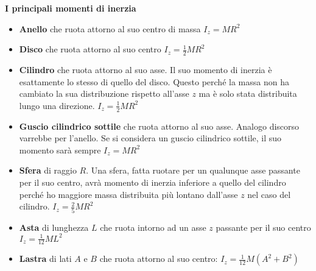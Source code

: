 \documentclass[10pt,a4paper]{book}
\begin{document}
\textbf{I principali momenti di inerzia}
\begin{itemize}

	\item \textbf{Anello} che ruota attorno al suo centro di massa $\boxed{I_z = MR^2}$

	\item \textbf{Disco} che ruota attorno al suo centro $\boxed{I_z=\frac{1}{2} MR^2}$

	\item \textbf{Cilindro} che ruota attorno al suo asse. Il suo momento di inerzia è esattamente lo stesso di quello del disco. Questo perché la massa non ha cambiato la sua distribuzione rispetto all'asse $z$ ma è solo stata distribuita lungo una direzione. $\boxed{I_z = \frac{1}{2} MR^2}$

	\item \textbf{Guscio cilindrico sottile} che ruota attorno al suo asse. Analogo discorso varrebbe per l'anello. Se si considera un guscio cilindrico sottile, il suo momento sarà sempre $\boxed{I_z = MR^2}$

	\item \textbf{Sfera} di raggio $R$. Una sfera, fatta ruotare per un qualunque asse passante per il suo centro, avrà momento di inerzia inferiore a quello del cilindro perché ho maggiore massa distribuita più lontano dall'asse $z$ nel caso del cilindro. $\boxed{I_z = \frac{2}{5}MR^2}$

	\item \textbf{Asta} di lunghezza $L$ che ruota intorno ad un asse $z$ passante per il suo centro $\boxed{I_z = \frac{1}{12}ML^2}$

	\item \textbf{Lastra}  di lati $A$ e $B$ che ruota attorno al suo centro: $\boxed{I_z = \frac{1}{12}M(A^2+B^2)}$
\end{itemize}
\end{document}

